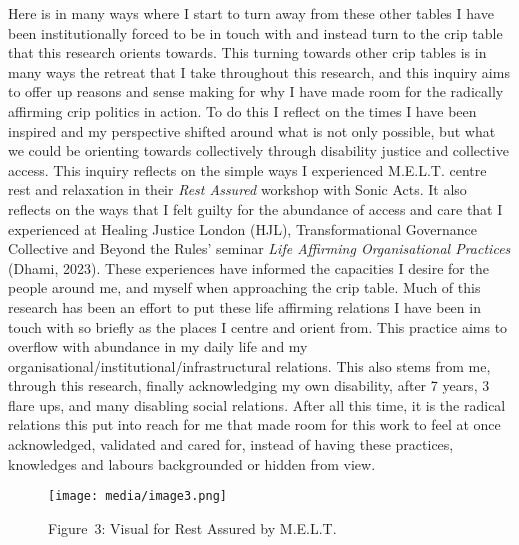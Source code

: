 Here is in many ways where I start to turn away from these other tables
I have been institutionally forced to be in touch with and instead turn
to the crip table that this research orients towards. This turning
towards other crip tables is in many ways the retreat that I take
throughout this research, and this inquiry aims to offer up reasons and
sense making for why I have made room for the radically affirming crip
politics in action. To do this I reflect on the times I have been
inspired and my perspective shifted around what is not only possible,
but what we could be orienting towards collectively through disability
justice and collective access. This inquiry reflects on the simple ways
I experienced M.E.L.T. centre rest and relaxation in their \emph{Rest
Assured} workshop with Sonic Acts. It also reflects on the ways that I
felt guilty for the abundance of access and care that I experienced at
Healing Justice London (HJL), Transformational Governance Collective and
Beyond the Rules' seminar \emph{Life Affirming Organisational Practices}
(Dhami, 2023). These experiences have informed the capacities I desire
for the people around me, and myself when approaching the crip table.
Much of this research has been an effort to put these life affirming
relations I have been in touch with so briefly as the places I centre
and orient from. This practice aims to overflow with abundance in my
daily life and my organisational/institutional/infrastructural
relations. This also stems from me, through this research, finally
acknowledging my own disability, after 7 years, 3 flare ups, and many
disabling social relations. After all this time, it is the radical
relations this put into reach for me that made room for this work to
feel at once acknowledged, validated and cared for, instead of having
these practices, knowledges and labours backgrounded or hidden from
view.

\begin{figure}
\hypertarget{fig:melt}{%
\centering
\texttt{[image: media/image3.png]}
\caption{Figure~3: Visual for Rest Assured by M.E.L.T.}\label{fig:melt}
}
\end{figure}

